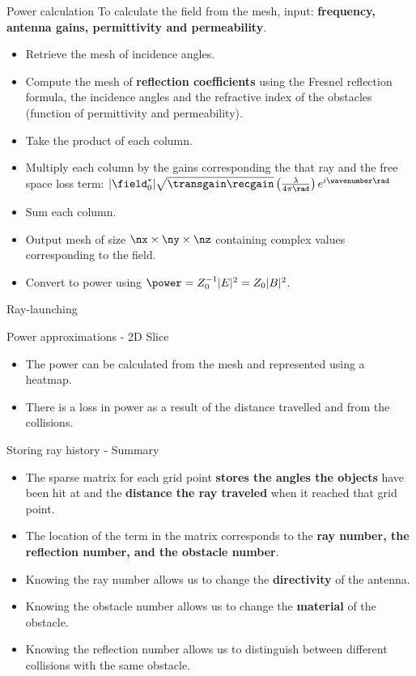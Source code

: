 \documentclass[8pt]{beamer}
\begin{document}
\begin{frame}
\begin{block}{Power calculation}
To calculate the field from the mesh, input: \textbf{frequency, antenna gains, permittivity and permeability}.
\begin{itemize}
\item Retrieve the mesh of incidence angles.
\item Compute the mesh of \textbf{reflection coefficients} using the Fresnel reflection formula, the incidence angles and the refractive index of the obstacles (function of permittivity and permeability).
\pause 
\item Take the product of each column.
\item Multiply each column by the gains corresponding the that ray and the free space loss term: $|\field_0^*|\sqrt{\transgain \recgain}\left(\frac{\lambda}{4 \pi\rad}\right)e^{i\wavenumber\rad}$
\item Sum each column.
\pause
\item Output mesh of size $\nx\times \ny \times \nz$ containing complex values corresponding to the field.
\item Convert to power using $\power=Z_0^{-1}|E|^2=Z_0|B|^2$.
\end{itemize}
\end{block}
\end{frame}
\begin{frame}{Ray-launching}
\begin{block}{Power approximations - 2D Slice}
\Heatmap
\begin{itemize}
\item
The power can be calculated from the mesh and represented using a heatmap.
\item There is a loss in power as a result of the distance travelled and from the collisions.
\end{itemize}
\end{block}
\end{frame}
\begin{frame}
\begin{block}{Storing ray history - Summary}
\begin{itemize}
\item
The sparse matrix for each grid point \textbf{stores the angles the objects} have been hit at and the \textbf{distance the ray traveled} when it reached that grid point. 
\pause
\item 
The location of the term in the matrix corresponds to the \textbf{ray number, the reflection number, and the obstacle number}. 
\pause
\item Knowing the ray number allows us to change the \textbf{directivity} of the antenna.
\pause
\item Knowing the obstacle number allows us to change the \textbf{material} of the obstacle.
\pause
\item Knowing the reflection number allows us to distinguish between different collisions with the same obstacle.
\end{itemize}
\end{block}
\end{frame}
\end{document}

